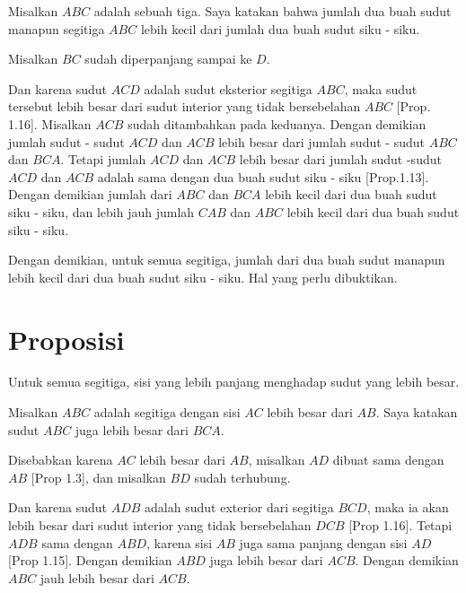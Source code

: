 \documentclass[a4paper]{book}
\begin{document}
Misalkan $ABC$ adalah sebuah tiga. Saya katakan bahwa jumlah  dua buah 
sudut manapun segitiga $ABC$ lebih kecil dari jumlah dua buah sudut siku - siku.

Misalkan $BC$ sudah diperpanjang sampai ke $D$.

Dan karena sudut $ACD$ adalah sudut eksterior segitiga $ABC$, maka sudut 
tersebut lebih besar dari sudut interior yang tidak bersebelahan 
$ABC$ [Prop. 1.16]. 
Misalkan $ACB$ sudah ditambahkan pada keduanya. Dengan demikian jumlah 
sudut - sudut $ACD$ dan $ACB$ lebih besar dari jumlah sudut - sudut $ABC$ dan 
$BCA$. Tetapi jumlah $ACD$ dan $ACB$  lebih besar dari jumlah sudut -sudut
$ACD$ dan $ACB$ adalah sama dengan dua buah sudut siku - siku [Prop.1.13].
Dengan demikian jumlah dari $ABC$ dan $BCA$ lebih kecil dari dua buah sudut 
siku - siku, dan lebih jauh jumlah $CAB$ dan $ABC$ lebih kecil dari dua
buah sudut siku - siku.

Dengan demikian, untuk semua segitiga, jumlah dari dua buah sudut manapun
lebih kecil dari dua buah sudut siku - siku. Hal yang perlu dibuktikan.


\section*{\centering Proposisi \thesection} 
Untuk semua segitiga, sisi yang lebih panjang menghadap sudut yang lebih
besar.

\begin{center}
\end{center}

Misalkan $ABC$ adalah segitiga dengan sisi $AC$ lebih besar dari $AB$. Saya
katakan sudut $ABC$ juga lebih besar dari $BCA$.

Disebabkan karena $AC$ lebih besar dari $AB$, misalkan $AD$ dibuat sama
dengan $AB$ [Prop 1.3], dan misalkan $BD$ sudah terhubung.

Dan karena sudut $ADB$ adalah sudut exterior dari segitiga $BCD$, maka ia
akan lebih besar dari sudut interior yang tidak bersebelahan $DCB$ [Prop 1.16].
Tetapi $ADB$ sama dengan $ABD$, karena sisi $AB$ juga sama panjang dengan 
sisi $AD$ [Prop 1.15]. Dengan demikian $ABD$ juga lebih besar dari $ACB$.
Dengan demikian $ABC$ jauh lebih besar dari $ACB$.
\end{document}
